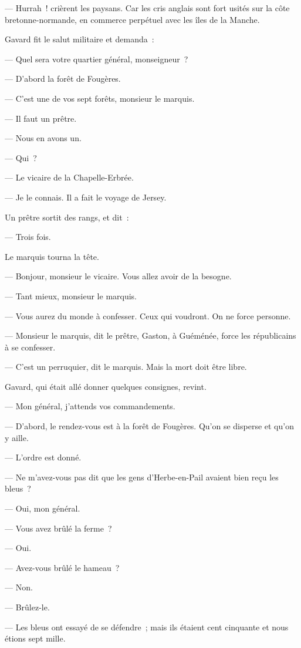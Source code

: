 \documentclass[french,twoside]{book} %
\begin{document}
— Hurrah ! crièrent les paysans. Car les cris anglais sont fort usités sur la côte bretonne-normande, en commerce perpétuel avec les îles de la Manche.\par
Gavard fit le salut militaire et demanda :\par
— Quel sera votre quartier général, monseigneur ?\par
— D’abord la forêt de Fougères.\par
 — C’est une de vos sept forêts, monsieur le marquis.\par
— Il faut un prêtre.\par
— Nous en avons un.\par
— Qui ?\par
— Le vicaire de la Chapelle-Erbrée.\par
— Je le connais. Il a fait le voyage de Jersey.\par
Un prêtre sortit des rangs, et dit :\par
— Trois fois.\par
Le marquis tourna la tête.\par
— Bonjour, monsieur le vicaire. Vous allez avoir de la besogne.\par
— Tant mieux, monsieur le marquis.\par
— Vous aurez du monde à confesser. Ceux qui voudront. On ne force personne.\par
— Monsieur le marquis, dit le prêtre, Gaston, à Guéménée, force les républicains à se confesser.\par
— C’est un perruquier, dit le marquis. Mais la mort doit être libre.\par
Gavard, qui était allé donner quelques consignes, revint.\par
— Mon général, j’attends vos commandements.\par
— D’abord, le rendez-vous est à la forêt de Fougères. Qu’on se disperse et qu’on y aille.\par
— L’ordre est donné.\par
— Ne m’avez-vous pas dit que les gens d’Herbe-en-Pail avaient bien reçu les bleus ?\par
— Oui, mon général.\par
— Vous avez brûlé la ferme ?\par
— Oui.\par
 — Avez-vous brûlé le hameau ?\par
— Non.\par
— Brûlez-le.\par
— Les bleus ont essayé de se défendre ; mais ils étaient cent cinquante et nous étions sept mille.\par
\end{document}
